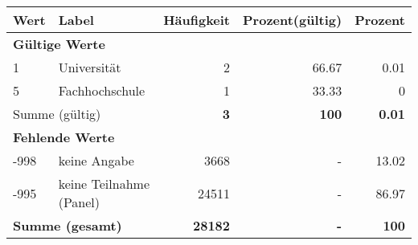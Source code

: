      \begin{longtable}{lXrrr}
     \toprule
     \textbf{Wert} & \textbf{Label} & \textbf{Häufigkeit} & \textbf{Prozent(gültig)} & \textbf{Prozent} \\
     \endhead
     \midrule
     \multicolumn{5}{l}{\textbf{Gültige Werte}}\\

     1 &
     \multicolumn{1}{X}{ Universität   } &


       \num{2} &
       \num[round-mode=places,round-precision=2]{66.67} &
         \num[round-mode=places,round-precision=2]{0.01} \\

     5 &
     \multicolumn{1}{X}{ Fachhochschule   } &


       \num{1} &
       \num[round-mode=places,round-precision=2]{33.33} &
         \num[round-mode=places,round-precision=2]{0} \\
     \midrule
     \multicolumn{2}{l}{Summe (gültig)} &
       \textbf{\num{3}} &
     \textbf{\num{100}} &
       \textbf{\num[round-mode=places,round-precision=2]{0.01}} \\
     \multicolumn{5}{l}{\textbf{Fehlende Werte}}\\
       -998 &
       keine Angabe &
         \num{3668} &
        - &
         \num[round-mode=places,round-precision=2]{13.02} \\
       -995 &
       keine Teilnahme (Panel) &
         \num{24511} &
        - &
         \num[round-mode=places,round-precision=2]{86.97} \\
     \midrule
     \multicolumn{2}{l}{\textbf{Summe (gesamt)}} &
          \textbf{\num{28182}} &
        \textbf{-} &
        \textbf{\num{100}} \\
     \bottomrule
     \end{longtable}
     
